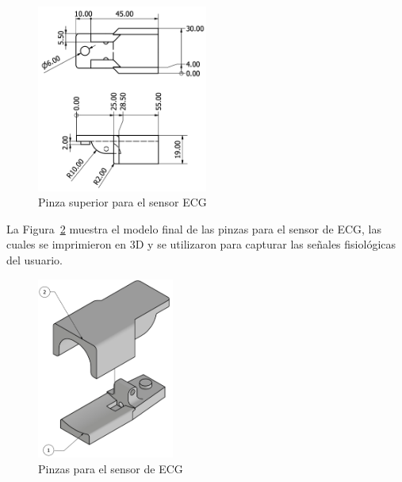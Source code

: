     \begin{figure}[H]
        \centering
        \includegraphics[width=0.5\textwidth]{img/Desarrollo/pinza_superior.png}
        \caption{Pinza superior para el sensor ECG}
        \label{fig:Pinza_Superior}
    \end{figure}

    La Figura~\ref{fig:Pinzas_ECG} muestra el modelo final de las pinzas para el sensor de ECG, las cuales se imprimieron en 3D y se utilizaron para capturar las señales fisiológicas del usuario.

    \begin{figure}[H]
        \centering
        \includegraphics[width=0.4\textwidth]{img/Desarrollo/pinzas_electrocardiograma.png}
        \caption{Pinzas para el sensor de ECG}
        \label{fig:Pinzas_ECG}
    \end{figure}

        


